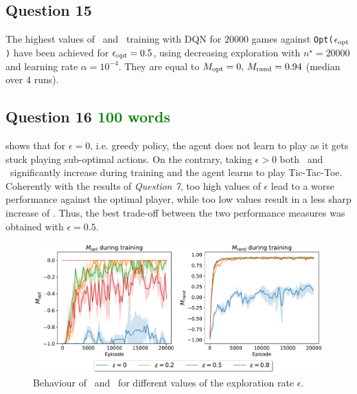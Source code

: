 \documentclass[10pt]{IEEEtran}
\begin{document}
\subsection*{Question 15}
The highest values of \mopt\  and \mrand\  training with DQN for $20000$ games against \texttt{Opt($\epsilon_{\text{opt}}$)} have been achieved for $\epsilon_{\text{opt}} = 0.5$, using decreasing exploration with $n^{\star} = 20000$ and learning rate $\alpha = 10^{-4}$. They are equal to $M_{\text{opt}} = 0, \, M_{\text{rand}} = 0.94$ (median over $4$ runs).

\subsection*{Question 16 \textcolor{Green}{100 words}}
 shows that for $\epsilon = 0$, i.e. greedy policy, the agent does not learn to play as it gets stuck playing sub-optimal actions. On the contrary, taking $\epsilon > 0$ both \mopt\ and \mrand\ significantly increase during training and the agent learns to play Tic-Tac-Toe. Coherently with the results of \emph{Question 7}, too high values of $\epsilon$ lead to a worse performance against the optimal player, while too low values result in a less sharp increase of \mrand. 
Thus, the best trade-off between the two performance measures was obtained with $\epsilon = 0.5$.
\begin{figure}[h]
    \centering
    \includegraphics[width = \linewidth]{code/figures/performance_epsilon_dqn_self.pdf}
    \caption{Behaviour of \mopt\ and \mrand\ for different values of the exploration rate $\epsilon$.}
    \label{plot_question16}
\end{figure}
\end{document}
